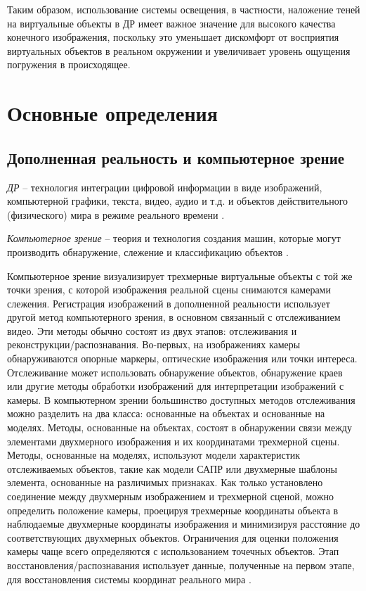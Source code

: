 Таким образом, использование системы освещения, в частности, наложение теней на виртуальные объекты в ДР имеет важное значение для высокого качества конечного изображения, поскольку это уменьшает дискомфорт от восприятия виртуальных объектов в реальном окружении и увеличивает уровень ощущения погружения в происходящее.

\section{Основные определения}

\subsection{Дополненная реальность и компьютерное зрение}

\textit{ДР} -- технология интеграции цифровой информации в виде изображений, компьютерной графики, текста, видео, аудио и т.д. и объектов действительного (физического) мира в режиме реального времени \cite{tech-ar}.

\textit{Компьютерное зрение} -- теория и технология создания машин, которые могут производить обнаружение, слежение и классификацию объектов \cite{comp_vision}. 

Компьютерное зрение визуализирует трехмерные виртуальные объекты с той же точки зрения, с которой изображения реальной сцены снимаются камерами слежения. Регистрация изображений в дополненной реальности использует другой метод компьютерного зрения, в основном связанный с отслеживанием видео. Эти методы обычно состоят из двух этапов: отслеживания и реконструкции/распознавания. Во-первых, на изображениях камеры обнаруживаются опорные маркеры, оптические изображения или точки интереса. Отслеживание может использовать обнаружение объектов, обнаружение краев или другие методы обработки изображений для интерпретации изображений с камеры. В компьютерном зрении большинство доступных методов отслеживания можно разделить на два класса: основанные на объектах и основанные на моделях. Методы, основанные на объектах, состоят в обнаружении связи между элементами двухмерного изображения и их координатами трехмерной сцены. Методы, основанные на моделях, используют модели характеристик отслеживаемых объектов, такие как модели САПР \cite{cad} или двухмерные шаблоны элемента, основанные на различимых признаках. Как только установлено соединение между двухмерным изображением и трехмерной сценой, можно определить положение камеры, проецируя трехмерные координаты объекта в наблюдаемые двухмерные координаты изображения и минимизируя расстояние до соответствующих двухмерных объектов. Ограничения для оценки положения камеры чаще всего определяются с использованием точечных объектов. Этап восстановления/распознавания использует данные, полученные на первом этапе, для восстановления системы координат реального мира \cite{ar_overview}.

